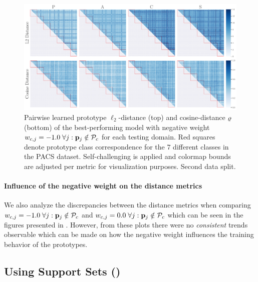 \begin{figure}[t]
    \centering
    \includegraphics[width=\textwidth]{Figures/Chapter4/2021-01-21-ProDropIncorrectWeight-1.0WithSCdrop_f0.5SAVEResNet18oracle_validation_trial1.pdf}
    \caption[Second data split pairwise self-challenging prototype distances with $w_{c,j} = -1.0$] {Pairwise learned prototype $\ell_2$-distance (top) and cosine-distance $\varrho$ (bottom) of the best-performing model with negative weight $w_{c,j} = -1.0\; \forall j: \mathbf{p}_{j} \notin \mathcal{P}_c$ for each testing domain. Red squares denote prototype class correspondence for the $7$ different classes in the PACS dataset. Self-challenging is applied and colormap bounds are adjusted per metric for visualization purposes. Second data split.}
    \label{fig:pw_distance_trial1-sc}
\end{figure}

\paragraph{Influence of the negative weight on the distance metrics}
We also analyze the discrepancies between the distance metrics when comparing $w_{c,j} = -1.0\; \forall j: \mathbf{p}_{j} \notin \mathcal{P}_c$ and $w_{c,j} = 0.0\; \forall j: \mathbf{p}_{j} \notin \mathcal{P}_c$ which can be seen in the figures presented in . However, from these plots there were no \emph{consistent} trends observable which can be made on how the negative weight influences the training behavior of the prototypes. 

\subsection{Using Support Sets (\dtransformers)}
\label{sec:dtransformers}

